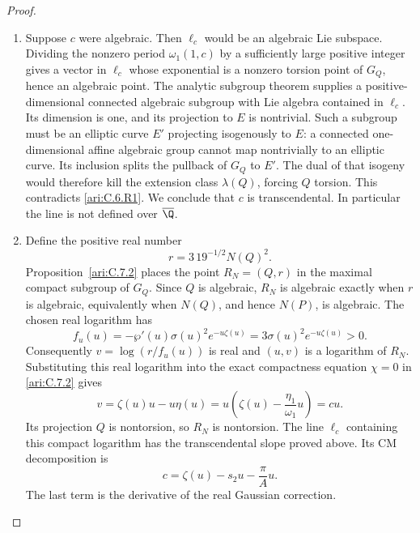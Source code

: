 \begin{proof}
\begin{enumerate}[label=\arabic*.,leftmargin=*]
\item Suppose $c$ were algebraic. Then $\ell_c$ would be an
algebraic Lie subspace. Dividing the nonzero period
$\omega_1(1,c)$ by a sufficiently large positive integer
gives a vector in $\ell_c$ whose exponential is a nonzero
torsion point of $G_Q$, hence an algebraic point. The
analytic subgroup theorem
\citep[Theorem~6.1, arXiv v8, p.~43]{huber2022} supplies a positive-dimensional
connected algebraic subgroup with Lie algebra contained in
$\ell_c$. Its dimension is one, and its projection to $E$
is nontrivial. Such a subgroup must be an elliptic curve
$E'$ projecting isogenously to $E$: a connected
one-dimensional affine algebraic group cannot map
nontrivially to an elliptic curve. Its inclusion splits the
pullback of $G_Q$ to $E'$. The dual of that isogeny would
therefore kill the extension class $\lambda(Q)$, forcing
$Q$ torsion. This contradicts \ref{ari:C.6.R1}. We conclude that $c$
is transcendental. In particular the line is not defined over
$\overline\Q$.

\item Define the positive real number
\[
 r=3\,19^{-1/2}N(Q)^2.
\]
Proposition~\ref{ari:C.7.2} places the point $R_N=(Q,r)$
in the maximal compact subgroup of $G_Q$. Since $Q$ is algebraic,
$R_N$ is algebraic exactly when $r$ is algebraic, equivalently
when $N(Q)$, and hence $N(P)$, is algebraic. The chosen real
logarithm has
\[
 f_u(u)=-\wp'(u)\sigma(u)^2e^{-u\zeta(u)}
        =3\sigma(u)^2e^{-u\zeta(u)}>0.
\]
Consequently $v=\log(r/f_u(u))$ is real and
$(u,v)$ is a logarithm of $R_N$. Substituting this real logarithm into the exact
compactness equation $\chi=0$ in \ref{ari:C.7.2} gives
\[
 v=\zeta(u)u-u\eta(u)
   =u\left(\zeta(u)-\frac{\eta_1}{\omega_1}u\right)=cu.
\]
Its projection $Q$ is nontorsion, so $R_N$ is nontorsion.
The line $\ell_c$ containing this compact logarithm has the
transcendental slope proved above. Its CM decomposition is
\[
 c=\zeta(u)-s_2u-\frac{\pi}{A}u.
\]
The last term is the derivative of the real Gaussian
correction.
\end{enumerate}
\end{proof}
